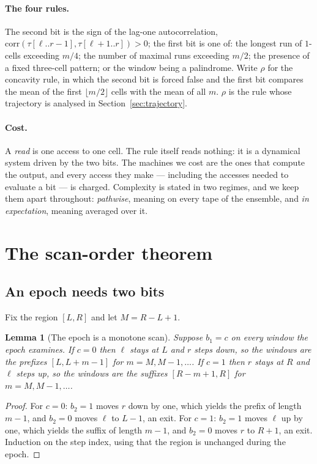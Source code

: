 \documentclass[11pt]{article}
\newtheorem{lemma}{Lemma}
\begin{document}
\paragraph{The four rules.} The second bit is the sign of the lag-one autocorrelation,
$\mathrm{corr}(\tau[\ell..r-1],\tau[\ell+1..r])>0$; the first bit is one of: the longest
run of $1$-cells exceeding $m/4$; the number of maximal runs exceeding $m/2$; the presence
of a fixed three-cell pattern; or the window being a palindrome. Write $\rho$ for the
concavity rule, in which the second bit is forced false and the first bit compares the mean
of the first $\lfloor m/2\rfloor$ cells with the mean of all $m$. $\rho$ is the rule whose
trajectory is analysed in Section~\ref{sec:trajectory}.

\paragraph{Cost.} A \emph{read} is one access to one cell. The rule itself reads nothing:
it is a dynamical system driven by the two bits. The machines we cost are the ones that
compute the output, and every access they make --- including the accesses needed to
evaluate a bit --- is charged. Complexity is stated in two regimes, and we keep them apart
throughout: \emph{pathwise}, meaning on every tape of the ensemble, and \emph{in
expectation}, meaning averaged over it.

\section{The scan-order theorem}\label{sec:order}

\subsection{An epoch needs two bits}

Fix the region $[L,R]$ and let $M=R-L+1$.

\begin{lemma}[The epoch is a monotone scan]\label{lem:monotone}
Suppose $b_1=c$ on every window the epoch examines. If $c=0$ then $\ell$ stays at $L$ and
$r$ steps down, so the windows are the prefixes $[L,L+m-1]$ for $m=M,M-1,\dots$. If $c=1$
then $r$ stays at $R$ and $\ell$ steps up, so the windows are the suffixes $[R-m+1,R]$ for
$m=M,M-1,\dots$.
\end{lemma}

\begin{proof}
For $c=0$: $b_2=1$ moves $r$ down by one, which yields the prefix of length $m-1$, and
$b_2=0$ moves $\ell$ to $L-1$, an exit. For $c=1$: $b_2=1$ moves $\ell$ up by one, which
yields the suffix of length $m-1$, and $b_2=0$ moves $r$ to $R+1$, an exit. Induction on
the step index, using that the region is unchanged during the epoch.
\end{proof}
\end{document}
